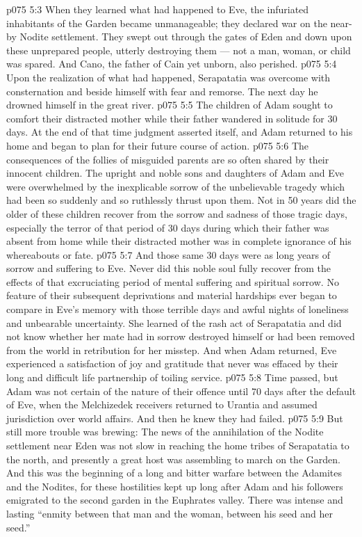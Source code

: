 \vs p075 5:3 When they learned what had happened to Eve, the infuriated inhabitants of the Garden became unmanageable; they declared war on the near-by Nodite settlement. They swept out through the gates of Eden and down upon these unprepared people, utterly destroying them --- not a man, woman, or child was spared. And Cano, the father of Cain yet unborn, also perished.
\vs p075 5:4 Upon the realization of what had happened, Serapatatia was overcome with consternation and beside himself with fear and remorse. The next day he drowned himself in the great river.
\vs p075 5:5 The children of Adam sought to comfort their distracted mother while their father wandered in solitude for 30 days. At the end of that time judgment asserted itself, and Adam returned to his home and began to plan for their future course of action.
\vs p075 5:6 The consequences of the follies of misguided parents are so often shared by their innocent children. The upright and noble sons and daughters of Adam and Eve were overwhelmed by the inexplicable sorrow of the unbelievable tragedy which had been so suddenly and so ruthlessly thrust upon them. Not in 50 years did the older of these children recover from the sorrow and sadness of those tragic days, especially the terror of that period of 30 days during which their father was absent from home while their distracted mother was in complete ignorance of his whereabouts or fate.
\vs p075 5:7 And those same 30 days were as long years of sorrow and suffering to Eve. Never did this noble soul fully recover from the effects of that excruciating period of mental suffering and spiritual sorrow. No feature of their subsequent deprivations and material hardships ever began to compare in Eve’s memory with those terrible days and awful nights of loneliness and unbearable uncertainty. She learned of the rash act of Serapatatia and did not know whether her mate had in sorrow destroyed himself or had been removed from the world in retribution for her misstep. And when Adam returned, Eve experienced a satisfaction of joy and gratitude that never was effaced by their long and difficult life partnership of toiling service.
\vs p075 5:8 \pc Time passed, but Adam was not certain of the nature of their offence until 70 days after the default of Eve, when the Melchizedek receivers returned to Urantia and assumed jurisdiction over world affairs. And then he knew they had failed.
\vs p075 5:9 \pc But still more trouble was brewing: The news of the annihilation of the Nodite settlement near Eden was not slow in reaching the home tribes of Serapatatia to the north, and presently a great host was assembling to march on the Garden. And this was the beginning of a long and bitter warfare between the Adamites and the Nodites, for these hostilities kept up long after Adam and his followers emigrated to the second garden in the Euphrates valley. There was intense and lasting “enmity between that man and the woman, between his seed and her seed.”
